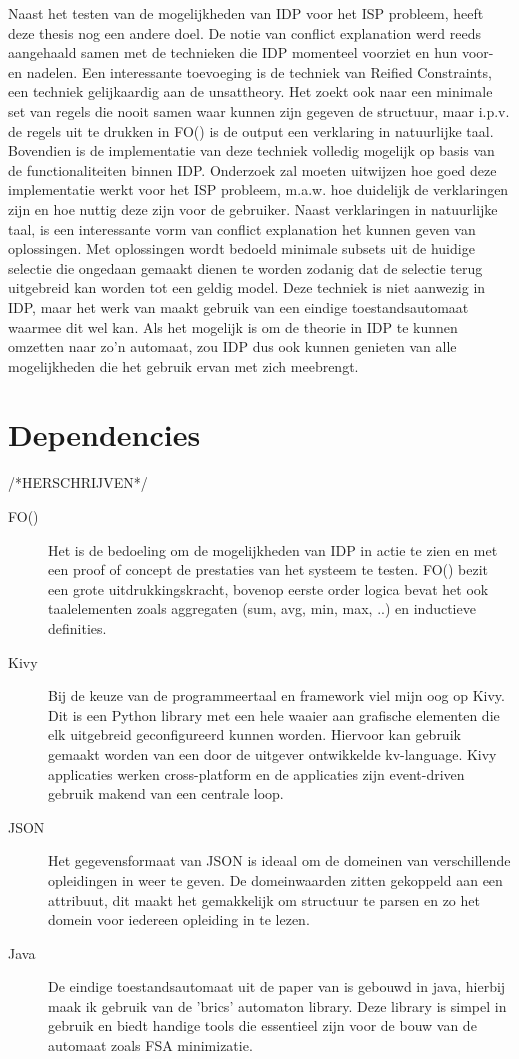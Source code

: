 Naast het testen van de mogelijkheden van IDP voor het ISP probleem, heeft deze thesis nog een andere doel. De notie van conflict explanation werd reeds aangehaald samen met de technieken die IDP momenteel voorziet en hun voor- en nadelen. Een interessante toevoeging is de techniek van Reified Constraints, een techniek gelijkaardig aan de unsattheory. Het zoekt ook naar een minimale set van regels die nooit samen waar kunnen zijn gegeven de structuur, maar i.p.v. de regels uit te drukken in FO(\textperiodcentered) is de output een verklaring in natuurlijke taal. Bovendien is de implementatie van deze techniek volledig mogelijk op basis van de functionaliteiten binnen IDP. Onderzoek zal moeten uitwijzen hoe goed deze implementatie werkt voor het ISP probleem, m.a.w. hoe duidelijk de verklaringen zijn en hoe nuttig deze zijn voor de gebruiker.
Naast verklaringen in natuurlijke taal, is een interessante vorm van conflict explanation het kunnen geven van oplossingen. Met oplossingen wordt bedoeld minimale subsets uit de huidige selectie die ongedaan gemaakt dienen te worden zodanig dat de selectie terug uitgebreid kan worden tot een geldig model. Deze techniek is niet aanwezig in IDP, maar het werk van \citep{amilhastre2002consistency} maakt gebruik van een eindige toestandsautomaat waarmee dit wel kan. Als het mogelijk is om de theorie in IDP te kunnen omzetten naar zo'n automaat, zou IDP dus ook kunnen genieten van alle mogelijkheden die het gebruik ervan met zich meebrengt. 

\section{Dependencies}
/*HERSCHRIJVEN*/
\begin{description}
\item [FO(\textperiodcentered)] Het is de bedoeling om de mogelijkheden van IDP in actie te zien en met een proof of concept de prestaties van het systeem te testen. FO(\textperiodcentered) bezit een grote uitdrukkingskracht, bovenop eerste order logica bevat het ook taalelementen zoals aggregaten (sum, avg, min, max, ..) en inductieve definities.
\item [Kivy] Bij de keuze van de programmeertaal en framework viel mijn oog op Kivy. Dit is een Python library met een hele waaier aan grafische elementen die elk uitgebreid geconfigureerd kunnen worden. Hiervoor kan gebruik gemaakt worden van een door de uitgever ontwikkelde kv-language. Kivy applicaties werken cross-platform en de applicaties zijn event-driven gebruik makend van een centrale loop.
\item [JSON] Het gegevensformaat van JSON is ideaal om de domeinen van verschillende opleidingen in weer te geven. De domeinwaarden zitten gekoppeld aan een attribuut, dit maakt het gemakkelijk om structuur te parsen en zo het domein voor iedereen opleiding in te lezen.
\item [Java] De eindige toestandsautomaat uit de paper van \citep{amilhastre2002consistency} is gebouwd in java, hierbij maak ik gebruik van de 'brics' automaton library. Deze library is simpel in gebruik en biedt handige tools die essentieel zijn voor de bouw van de automaat zoals FSA minimizatie. 
\end{description}
